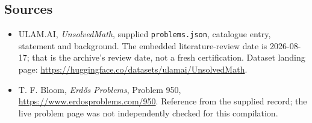 \documentclass[11pt,a4paper]{article}
\begin{document}
\subsection{Sources}

{\small

\begin{itemize}

\item[\hypertarget{source:statement:1}{S1}] ULAM.AI, \emph{UnsolvedMath}, supplied \texttt{problems.json}, catalogue entry, statement and background. The embedded literature-review date is 2026-08-17; that is the archive’s review date, not a fresh certification. Dataset landing page: \url{https://huggingface.co/datasets/ulamai/UnsolvedMath}.

\item[\hypertarget{source:statement:2}{S2}] T. F. Bloom, \emph{Erdős Problems}, Problem 950, \url{https://www.erdosproblems.com/950}. Reference from the supplied record; the live problem page was not independently checked for this compilation.

\end{itemize}

}

\label{end:statement}
\end{document}

